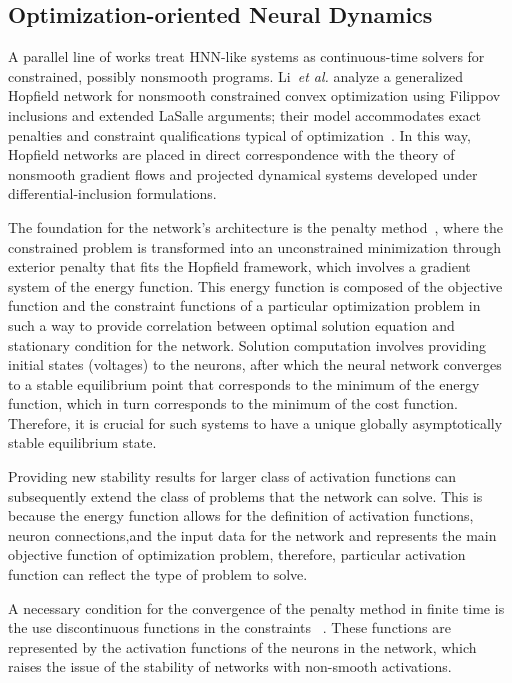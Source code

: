 \documentclass[journal]{IEEEtran}
\theoremstyle{myplain}
\begin{document}
\subsection{Optimization-oriented Neural Dynamics}

A parallel line of works treat HNN-like systems as continuous-time solvers for constrained, 
possibly nonsmooth programs. 
Li~\emph{et al.} analyze a generalized Hopfield network for nonsmooth constrained convex optimization 
using Filippov inclusions and extended LaSalle arguments; 
their model accommodates exact penalties and constraint qualifications typical of optimization~\cite{LiTNNLS2015}. 
In this way, Hopfield networks are placed in direct correspondence 
with the theory of nonsmooth gradient flows and projected dynamical systems 
developed under differential-inclusion formulations.


The foundation for the network’s architecture is the penalty method~\cite{penalty, 517}, where the constrained problem is transformed into an unconstrained minimization through exterior penalty that fits the Hopfield framework, which involves a gradient system of the energy function. This energy function is composed of the objective function and the constraint functions of a particular optimization problem in such a way to provide correlation between optimal solution equation and stationary condition for the network. Solution computation involves providing initial states (voltages) to the neurons, after which the neural network converges to a stable equilibrium point that corresponds to the minimum of the energy function, which in turn corresponds to the minimum
of the cost function. Therefore, it is crucial for such systems to have a unique globally asymptotically stable equilibrium state.

Providing new stability results for larger class of activation functions can subsequently extend the class of problems that the network can solve. This is because the energy function allows for the definition of activation functions, neuron connections,and the input data for the network and represents the main objective function of optimization problem, therefore, particular activation function can reflect the type of problem to solve.

A necessary condition for the convergence of the penalty method in finite time is the use discontinuous functions in the constraints ~\cite{517}. These functions are represented by the activation functions of the neurons in the network, which raises the issue of the stability of networks with non-smooth activations.
\end{document}
